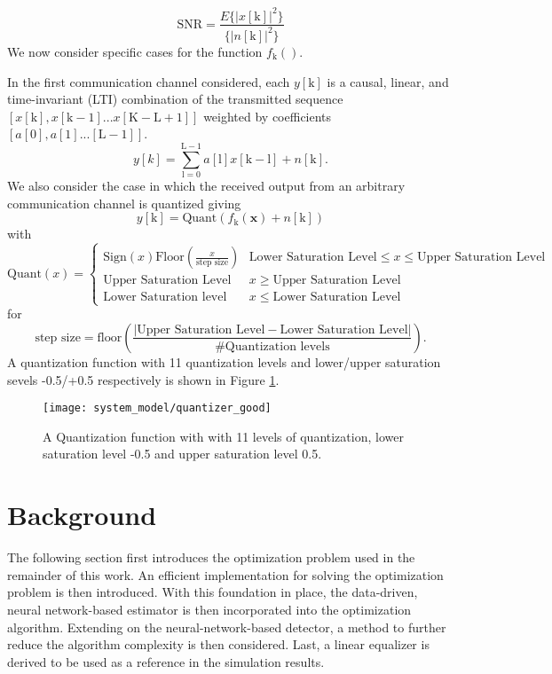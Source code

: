 \begin{equation*}
\text{SNR} = \frac{E\{|x[\text{k}]|^2\}}{\{|n[\text{k}]|^2\}}
\end{equation*}
	We now consider specific cases for the function $f_{\text{k}}()$. 
	\par
In the first communication channel considered, each $y[\text{k}]$ is a causal, linear, and time-invariant (LTI) combination of the transmitted sequence $[x[\text{k}], x[\text{k}-1]... x[\text{K}-\text{L}+1]]$ weighted by coefficients $[a[0], a[1].. . [\text{L}-1]]$. 
\begin{equation}\label{lti_channel}
y[k] = \sum_{\mathrm{\text{l}=0}}^{\mathrm{\text{L}-1}} a[\text{l}]x[\text{k}-\text{l}]+ n[\text{k}].
\end{equation}
We also consider the case in which the received output from an arbitrary communication channel is quantized giving
\begin{equation}\label{lti_quantized_channel}
y[\text{k}] = \text{Quant}(f_{\text{k}}(\mathbf{x}) + n[\text{k}])
\end{equation}
 with
\[\text{Quant}(x) = 
\begin{cases}
\text{Sign}(x)\text{Floor}(\frac{x}{\text{step size}})& \text{Lower Saturation Level} \leq x \leq \text{Upper Saturation Level}\\
\text{Upper Saturation Level} & x \geq \text{Upper Saturation Level}\\
\text{Lower Saturation level} & x \leq \text{Lower Saturation Level}
\end{cases}
\]
 for 
 \begin{equation*}
  \text{step size} =\text{floor}\left(\frac{|\text{Upper Saturation Level}- \text{Lower Saturation Level}|}{\text{\# Quantization levels}}\right).
 \end{equation*} A quantization function with 11 quantization levels and lower/upper saturation sevels -0.5/+0.5 respectively is shown in Figure \ref{fig:Quantized Overlay}.
 
 \begin{figure}[H]
\centering
	\texttt{[image: system\_model/quantizer\_good]}
			  \caption{A Quantization function with with 11 levels of quantization, lower saturation level -0.5 and upper saturation level 0.5. }
	  \label{fig:Quantized Overlay}
\end{figure}

 
\section{Background}
The following section first introduces the optimization problem used in the remainder of this work. An efficient implementation for solving the optimization problem is then introduced. With this foundation in place, the data-driven, neural network-based estimator is then incorporated into the optimization algorithm. 
Extending on the neural-network-based detector, a method to further reduce the algorithm complexity is then considered. Last, a linear equalizer is derived to be used as a reference in the simulation results. 
